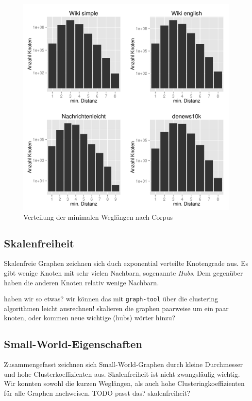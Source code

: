 \documentclass[11pt, a4paper]{article}
\begin{document}
\begin{figure}
    \centering
        \includegraphics[scale=.75]{mdh_plots.pdf}
    \caption{Verteilung der minimalen Weglängen nach Corpus}
    \label{fig-mdh}
\end{figure}

\subsection{Skalenfreiheit}
Skalenfreie Graphen zeichnen sich duch exponential verteilte Knotengrade aus.
Es gibt wenige Knoten mit sehr vielen Nachbarn, sogenannte \emph{Hubs}.
Dem gegenüber haben die anderen Knoten relativ wenige Nachbarn. 

haben wir so etwas? wir können das mit \texttt{graph-tool} über die
clustering algorithmen leicht ausrechnen!  skalieren die graphen paarweise um
ein paar knoten, oder kommen neue wichtige (hubs) wörter hinzu?

\subsection{Small-World-Eigenschaften}
Zusammengefasst zeichnen sich Small-World-Graphen durch kleine Durchmesser und
hohe Clusterkoeffizienten aus. Skalenfreiheit ist nicht zwangsläufig wichtig.
Wir konnten sowohl die kurzen Weglängen, als auch hohe Clusteringkoeffizienten
für alle Graphen nachweisen. TODO passt das? skalenfreiheit? 
\end{document}
